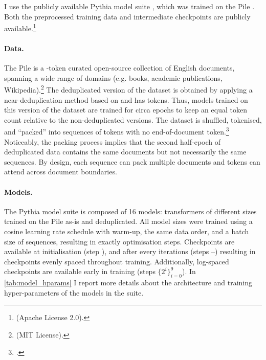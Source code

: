 I use the publicly available Pythia model suite \citep{biderman2023pythia}, which was trained on the Pile \citep{gao2020pile}. Both the preprocessed training data and intermediate checkpoints are publicly available.\footnote{\href{https://github.com/EleutherAI/pythia}{} (Apache License 2.0).} 

\paragraph{Data.}
The Pile is a -token curated open-source collection of English documents, spanning a wide range of domains (e.g. books, academic publications, Wikipedia).\footnote{\href{https://github.com/EleutherAI/the-pile}{} (MIT License).}  
The deduplicated version of the dataset is obtained by applying a near-deduplication method based on  and has  tokens.
Thus, models trained on this version of the dataset are trained for circa  epochs to keep an equal token count relative to the non-deduplicated versions.
The dataset is shuffled, tokenised, and \enquote{packed} into sequences of  tokens with no end-of-document token.\footnote{\href{https://github.com/EleutherAI/pythia/issues/123}{}.}
Noticeably, the packing process implies that the second half-epoch of deduplicated data contains the same documents but not necessarily the same sequences. 
By design, each sequence can pack multiple documents and tokens can attend across document boundaries.

\paragraph{Models.}
The Pythia model suite is composed of 16 models: transformers of  different sizes trained on the Pile as-is and deduplicated.
All model sizes were trained using a cosine learning rate schedule with warm-up, the same data order, and a batch size of  sequences, resulting in exactly  optimisation steps.
Checkpoints are available at initialisation (step ), and after every  iterations (steps --) resulting in  checkpoints evenly spaced throughout training. 
Additionally, log-spaced checkpoints are available early in training (steps $\{2^i\}_{i=0}^{9}$). In \cref{tab:model_hparams} I report more details about the architecture and training hyper-parameters of the models in the suite.

